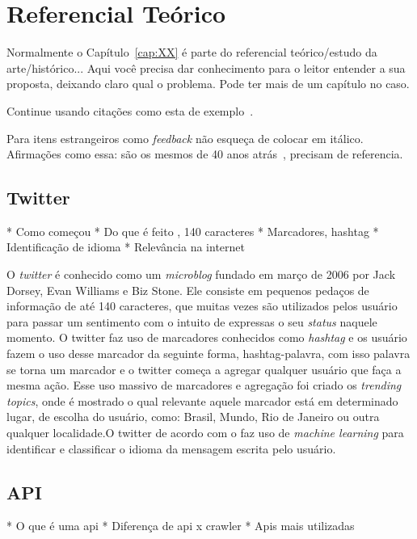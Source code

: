 \chapter{Referencial Teórico}\label{cap:referencial_teorico}

Normalmente o Capítulo~\ref{cap:XX} é parte do referencial teórico/estudo da arte/histórico... Aqui você precisa dar conhecimento para o leitor entender a sua proposta, deixando claro qual o problema. Pode ter mais de um capítulo no caso.


Continue usando citações como esta de exemplo~\cite{fangxing2010,gungor2011}.

Para itens estrangeiros como \textit{feedback}  não esqueça de colocar em itálico. Afirmações como essa: são os mesmos de 40 anos atrás~\cite{gungor2011}, precisam de referencia. 

\section{Twitter}\label{sec:twitter}

* Como começou
* Do que é feito , 140 caracteres
* Marcadores, hashtag
* Identificação de idioma
* Relevância na internet

O \textit{twitter} é conhecido como um \textit{microblog} fundado em março de 2006 por Jack Dorsey, Evan Williams e Biz Stone. Ele consiste em pequenos pedaços de informação de até 140 caracteres, que muitas vezes são utilizados pelos usuário para passar um sentimento com o intuito de expressas o seu \textit{status} naquele momento. O twitter faz uso de marcadores conhecidos como \textit{hashtag}
e os usuário fazem o uso desse marcador da seguinte forma, hashtag-palavra, com isso palavra se torna um marcador e o twitter começa a agregar qualquer usuário que faça a mesma ação. Esse uso massivo de marcadores e agregação foi criado os \textit{trending topics}, onde é mostrado o qual relevante aquele marcador está em determinado lugar, de escolha do usuário, como: Brasil, Mundo, Rio de Janeiro ou outra qualquer localidade.O twitter de acordo com o \cite{arneromannkurrik2013} faz uso de \textit{machine learning} para identificar e classificar o idioma da mensagem escrita pelo usuário.


\section{API}\label{sec:api}
* O que é uma api
* Diferença de api x crawler
* Apis mais utilizadas

